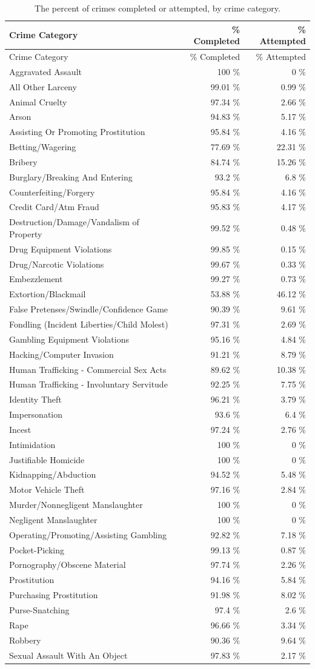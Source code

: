\documentclass[
  12pt,
  openany]{book}
\begin{document}
\begin{longtable}[]{@{}lrr@{}}
\caption{\label{tab:offensesCompleted}The percent of crimes completed or attempted, by crime category.}\tabularnewline
\toprule
Crime Category & \% Completed & \% Attempted\tabularnewline
\midrule
\endfirsthead
\toprule
Crime Category & \% Completed & \% Attempted\tabularnewline
\midrule
\endhead
Aggravated Assault & 100 \% & 0 \%\tabularnewline
All Other Larceny & 99.01 \% & 0.99 \%\tabularnewline
Animal Cruelty & 97.34 \% & 2.66 \%\tabularnewline
Arson & 94.83 \% & 5.17 \%\tabularnewline
Assisting Or Promoting Prostitution & 95.84 \% & 4.16 \%\tabularnewline
Betting/Wagering & 77.69 \% & 22.31 \%\tabularnewline
Bribery & 84.74 \% & 15.26 \%\tabularnewline
Burglary/Breaking And Entering & 93.2 \% & 6.8 \%\tabularnewline
Counterfeiting/Forgery & 95.84 \% & 4.16 \%\tabularnewline
Credit Card/Atm Fraud & 95.83 \% & 4.17 \%\tabularnewline
Destruction/Damage/Vandalism of Property & 99.52 \% & 0.48 \%\tabularnewline
Drug Equipment Violations & 99.85 \% & 0.15 \%\tabularnewline
Drug/Narcotic Violations & 99.67 \% & 0.33 \%\tabularnewline
Embezzlement & 99.27 \% & 0.73 \%\tabularnewline
Extortion/Blackmail & 53.88 \% & 46.12 \%\tabularnewline
False Pretenses/Swindle/Confidence Game & 90.39 \% & 9.61 \%\tabularnewline
Fondling (Incident Liberties/Child Molest) & 97.31 \% & 2.69 \%\tabularnewline
Gambling Equipment Violations & 95.16 \% & 4.84 \%\tabularnewline
Hacking/Computer Invasion & 91.21 \% & 8.79 \%\tabularnewline
Human Trafficking - Commercial Sex Acts & 89.62 \% & 10.38 \%\tabularnewline
Human Trafficking - Involuntary Servitude & 92.25 \% & 7.75 \%\tabularnewline
Identity Theft & 96.21 \% & 3.79 \%\tabularnewline
Impersonation & 93.6 \% & 6.4 \%\tabularnewline
Incest & 97.24 \% & 2.76 \%\tabularnewline
Intimidation & 100 \% & 0 \%\tabularnewline
Justifiable Homicide & 100 \% & 0 \%\tabularnewline
Kidnapping/Abduction & 94.52 \% & 5.48 \%\tabularnewline
Motor Vehicle Theft & 97.16 \% & 2.84 \%\tabularnewline
Murder/Nonnegligent Manslaughter & 100 \% & 0 \%\tabularnewline
Negligent Manslaughter & 100 \% & 0 \%\tabularnewline
Operating/Promoting/Assisting Gambling & 92.82 \% & 7.18 \%\tabularnewline
Pocket-Picking & 99.13 \% & 0.87 \%\tabularnewline
Pornography/Obscene Material & 97.74 \% & 2.26 \%\tabularnewline
Prostitution & 94.16 \% & 5.84 \%\tabularnewline
Purchasing Prostitution & 91.98 \% & 8.02 \%\tabularnewline
Purse-Snatching & 97.4 \% & 2.6 \%\tabularnewline
Rape & 96.66 \% & 3.34 \%\tabularnewline
Robbery & 90.36 \% & 9.64 \%\tabularnewline
Sexual Assault With An Object & 97.83 \% & 2.17 \%\tabularnewline

\end{longtable}
\end{document}
